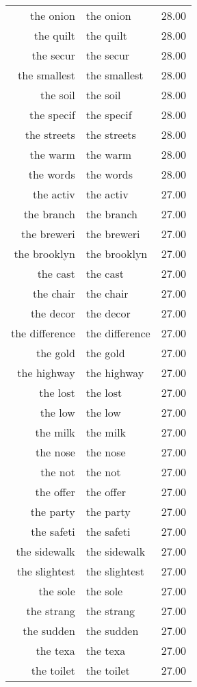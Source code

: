 \begin{table}[ht]
\begin{tabular}{rlr}
  the onion & the onion & 28.00 \\ 
  the quilt & the quilt & 28.00 \\ 
  the secur & the secur & 28.00 \\ 
  the smallest & the smallest & 28.00 \\ 
  the soil & the soil & 28.00 \\ 
  the specif & the specif & 28.00 \\ 
  the streets & the streets & 28.00 \\ 
  the warm & the warm & 28.00 \\ 
  the words & the words & 28.00 \\ 
  the activ & the activ & 27.00 \\ 
  the branch & the branch & 27.00 \\ 
  the breweri & the breweri & 27.00 \\ 
  the brooklyn & the brooklyn & 27.00 \\ 
  the cast & the cast & 27.00 \\ 
  the chair & the chair & 27.00 \\ 
  the decor & the decor & 27.00 \\ 
  the difference & the difference & 27.00 \\ 
  the gold & the gold & 27.00 \\ 
  the highway & the highway & 27.00 \\ 
  the lost & the lost & 27.00 \\ 
  the low & the low & 27.00 \\ 
  the milk & the milk & 27.00 \\ 
  the nose & the nose & 27.00 \\ 
  the not & the not & 27.00 \\ 
  the offer & the offer & 27.00 \\ 
  the party & the party & 27.00 \\ 
  the safeti & the safeti & 27.00 \\ 
  the sidewalk & the sidewalk & 27.00 \\ 
  the slightest & the slightest & 27.00 \\ 
  the sole & the sole & 27.00 \\ 
  the strang & the strang & 27.00 \\ 
  the sudden & the sudden & 27.00 \\ 
  the texa & the texa & 27.00 \\ 
  the toilet & the toilet & 27.00 \\ 

\end{tabular}
\end{table}

